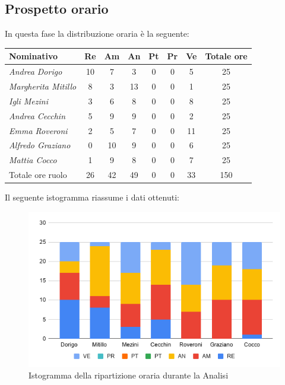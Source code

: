 \subsection{Prospetto orario}\label{PreventivoFaseDiAnalisiProspettoOrario}
In questa fase la distribuzione oraria è la seguente:
\quad
\def\tabularxcolumn#1{m{#1}}
{

	\begin{center}
		\renewcommand{\arraystretch}{1.4}
		\begin{tabularx}{\textwidth}{|X|c|c|c|c|c|c|c|}
			\hline
			\rowcolor{airforceblue}
			\textbf{Nominativo} & \textbf{Re} & \textbf{Am} & \textbf{An} & \textbf{Pt} & \textbf{Pr} & \textbf{Ve} & \textbf{Totale ore}\\
			\hline
			\textit{Andrea Dorigo} & 10 & 7 & 3 & 0 & 0 & 5 & 25\\
			\hline
			\textit{Margherita Mitillo} & 8 & 3 & 13 & 0 & 0 & 1 & 25\\
			\hline
			\textit{Igli Mezini} & 3 & 6 & 8 & 0 & 0 & 8 & 25\\
			\hline
			\textit{Andrea Cecchin} & 5 & 9 & 9 & 0 & 0 & 2 & 25\\
			\hline
			\textit{Emma Roveroni} & 2 & 5 & 7 & 0 & 0 & 11 & 25\\
			\hline
			\textit{Alfredo Graziano} & 0 & 10 & 9 & 0 & 0 & 6 & 25\\
			\hline
			\textit{Mattia Cocco} & 1 & 9 & 8 & 0 & 0 & 7 & 25\\
			\hline
			Totale ore ruolo & 26 & 42 & 49 & 0 & 0 & 33 & 150\\
			\hline
		\end{tabularx}
	\end{center}

Il seguente istogramma riassume i dati ottenuti:
\begin{figure}[!h]
	\begin{center}
		\includegraphics[width=0.7\linewidth]{../immagini/pdp/istogramma_analisi.png}
		\caption{Istogramma della ripartizione oraria durante la Analisi}
	\end{center}
\end{figure}
\clearpage
}
